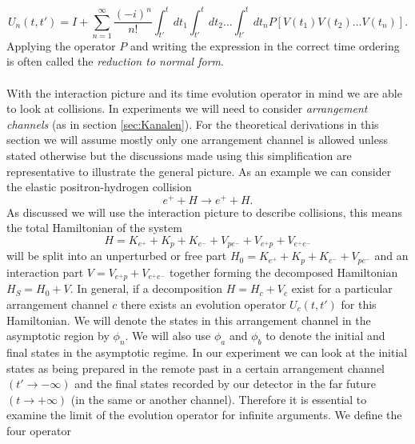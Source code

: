 \documentclass[11pt]{article}
\numberwithin{equation}{section}
\begin{document}
\begin{equation}
	U_n(t,t') = I + \underset{n=1}{\overset{\infty}\sum}\frac{(-i)^n}{n!}\int_{t'}^t dt_1 \int_{t'}^{t}dt_2 \ldots \int_{t'}^{t}dt_n P[V(t_1) V(t_2) \ldots V(t_n)].
\end{equation}
Applying the operator $P$ and writing the expression in the correct time ordering is often called the \emph{reduction to normal form}.\\
\\
With the interaction picture and its time evolution operator in mind we are able to look at collisions. In experiments we will need to consider \emph{arrangement channels} (as in section \ref{sec:Kanalen}). For the theoretical derivations in this section we will assume mostly only one arrangement channel is allowed unless stated otherwise but the discussions made using this simplification are representative to illustrate the general picture. As an example we can consider the elastic positron-hydrogen collision
\begin{equation}
	e^+ + H \rightarrow e^+ + H.
\end{equation}
As discussed we will use the interaction picture to describe collisions, this means the total Hamiltonian of the system
\begin{equation}
H = K_{e^+} + K_p + K_{e^-} + V_{pe^-} + V_{e^+ p} + V_{e^+ e^-}	
\end{equation}
will be split into an unperturbed or free part $H_0 = K_{e^+} + K_p + K_{e^-} + V_{pe^-}$ and an interaction part $V = V_{e^+ p} + V_{e^+ e^-}$  together forming the decomposed Hamiltonian $H_S =  H_0 + V$. In general, if a decomposition $H = H_c + V_c$ exist for a particular arrangement channel $c$ there exists an evolution operator $U_c(t,t')$ for this Hamiltonian. We will denote the states in this arrangement channel in the asymptotic region by $\phi_n$. We will also use $\phi_a$ and $\phi_b$ to denote the initial and final states in the asymptotic regime. In our experiment we can look at the initial states as being prepared in the remote past in a certain arrangement channel $(t' \rightarrow -\infty)$ and the final states  recorded by our detector in the far future $(t \rightarrow +\infty)$ (in the same or another channel). 
\newpage 
\noindent
Therefore it is essential to examine the limit of the evolution operator for infinite arguments. We define the four operator
\end{document}
